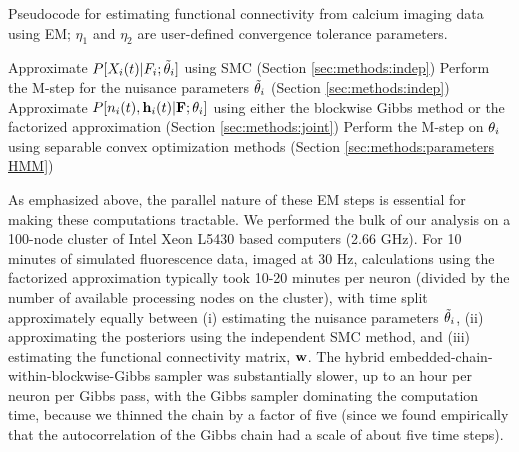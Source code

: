 \begin{algorithm}[t!]
\caption{Pseudocode for estimating functional connectivity from
calcium imaging data using EM; $\eta_1$ and $\eta_2$ are
user-defined convergence tolerance parameters.}
\label{eqn:pseudocode}
\begin{algorithmic}
      \State Approximate $P[X_i(t)|F_i; \tilde{\mathbf{\theta}}_i]$ using SMC (Section \ref{sec:methods:indep})
      \State Perform the M-step for the nuisance parameters $\tilde{\mathbf{\theta}}_i$ (Section \ref{sec:methods:indep})
    \EndWhile
  \EndFor
      \State Approximate $P[n_i(t), \mathbf{h}_i(t) |{\bf F}; \mathbf{\theta}_i]$ using either the blockwise Gibbs
      \State method or the factorized approximation (Section \ref{sec:methods:joint})
    \EndFor
  	\State Perform the M-step on $\mathbf{\theta}_i$ using separable convex optimization methods (Section \ref{sec:methods:parameters HMM})
  \EndFor
\EndWhile
\end{algorithmic}
\end{algorithm}

As emphasized above, the parallel nature of these EM steps is essential for making these computations tractable. We performed the bulk of our analysis on a 100-node cluster of Intel Xeon L5430 based computers (2.66 GHz). For 10 minutes of simulated fluorescence data, imaged at $30$ Hz, calculations using the factorized approximation typically took 10-20 minutes per neuron (divided by the number of available processing nodes on the cluster), with time split approximately equally between (i) estimating the nuisance parameters $\tilde{\mathbf{\theta}}_i $, (ii) approximating the posteriors using the independent SMC method, and (iii) estimating the functional connectivity matrix, $\mathbf{w}$. The hybrid embedded-chain-within-blockwise-Gibbs sampler was substantially slower, up to an hour per neuron per Gibbs pass, with the Gibbs sampler dominating the computation time, because we thinned the chain by a factor of five (since we found empirically that the autocorrelation of the Gibbs chain had a scale of about five time steps).

